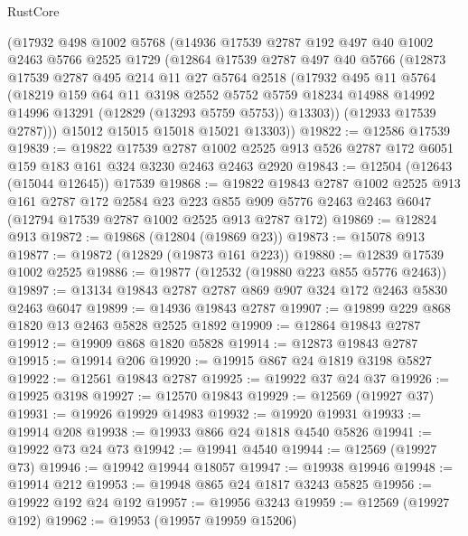 \begin{lexlean}{RustCore}
\begin{coremodule}
    (@17932
      @498
      @1002
      @5768
      (@14936
        @17539
        @2787
        @192
        @497
        @40
        @1002
        @2463
        @5766
        @2525
        @1729
        (@12864
          @17539
          @2787
          @497
          @40
          @5766
          (@12873
            @17539
            @2787
            @495
            @214
            @11
            @27
            @5764
            @2518
            (@17932
              @495
              @11
              @5764
              (@18219
                @159
                @64
                @11
                @3198
                @2552
                @5752
                @5759
                @18234
                @14988
                @14992
                @14996
                @13291
                (@12829 (@13293 @5759 @5753))
                @13303))
            (@12933 @17539 @2787)))
        @15012
        @15015
        @15018
        @15021
        @13303))
@19822 := @12586 @17539
@19839 := @19822
    @17539
    @2787
    @1002
    @2525
    @913
    @526
    @2787
    @172
    @6051
    @159
    @183
    @161
    @324
    @3230
    @2463
    @2463
    @2920
@19843 := @12504 (@12643 (@15044 @12645)) @17539
@19868 := @19822
    @19843
    @2787
    @1002
    @2525
    @913
    @161
    @2787
    @172
    @2584
    @23
    @223
    @855
    @909
    @5776
    @2463
    @2463
    @6047
    (@12794 @17539 @2787 @1002 @2525 @913 @2787 @172)
@19869 := @12824 @913
@19872 := @19868 (@12804 (@19869 @23))
@19873 := @15078 @913
@19877 := @19872 (@12829 (@19873 @161 @223))
@19880 := @12839 @17539 @1002 @2525
@19886 := @19877 (@12532 (@19880 @223 @855 @5776 @2463))
@19897 := @13134 @19843 @2787 @2787 @869 @907 @324 @172 @2463 @5830 @2463 @6047
@19899 := @14936 @19843 @2787
@19907 := @19899 @229 @868 @1820 @13 @2463 @5828 @2525 @1892
@19909 := @12864 @19843 @2787
@19912 := @19909 @868 @1820 @5828
@19914 := @12873 @19843 @2787
@19915 := @19914 @206
@19920 := @19915 @867 @24 @1819 @3198 @5827
@19922 := @12561 @19843 @2787
@19925 := @19922 @37 @24 @37
@19926 := @19925 @3198
@19927 := @12570 @19843
@19929 := @12569 (@19927 @37)
@19931 := @19926 @19929 @14983
@19932 := @19920 @19931
@19933 := @19914 @208
@19938 := @19933 @866 @24 @1818 @4540 @5826
@19941 := @19922 @73 @24 @73
@19942 := @19941 @4540
@19944 := @12569 (@19927 @73)
@19946 := @19942 @19944 @18057
@19947 := @19938 @19946
@19948 := @19914 @212
@19953 := @19948 @865 @24 @1817 @3243 @5825
@19956 := @19922 @192 @24 @192
@19957 := @19956 @3243
@19959 := @12569 (@19927 @192)
@19962 := @19953 (@19957 @19959 @15206)

\end{coremodule}
\end{lexlean}
